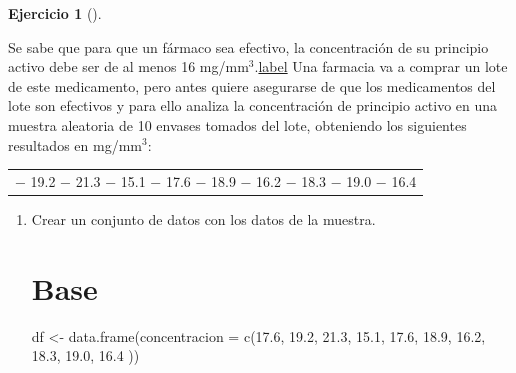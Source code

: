 \documentclass[
  a4paper,
]{scrreport}
\newenvironment{Shaded}{\begin{snugshade}}{\end{snugshade}}
\newcommand{\AttributeTok}[1]{\textcolor[rgb]{0.40,0.45,0.13}{#1}}
\newcommand{\FloatTok}[1]{\textcolor[rgb]{0.68,0.00,0.00}{#1}}
\newcommand{\FunctionTok}[1]{\textcolor[rgb]{0.28,0.35,0.67}{#1}}
\newcommand{\NormalTok}[1]{\textcolor[rgb]{0.00,0.23,0.31}{#1}}
\newcommand{\OtherTok}[1]{\textcolor[rgb]{0.00,0.23,0.31}{#1}}
\theoremstyle{definition}
\newtheorem{exercise}{Ejercicio}[chapter]
\theoremstyle{remark}
\begin{document}
\begin{exercise}[]\protect\hypertarget{exr-intervalo-media-principio-activo}{}\label{exr-intervalo-media-principio-activo}

Se sabe que para que un fármaco sea efectivo, la concentración de su
principio activo debe ser de al menos 16
mg/mm\(^3\).\href{http://localhost:1313/09-contrastes-hipotesis-parametricos.html}{label}
Una farmacia va a comprar un lote de este medicamento, pero antes quiere
asegurarse de que los medicamentos del lote son efectivos y para ello
analiza la concentración de principio activo en una muestra aleatoria de
10 envases tomados del lote, obteniendo los siguientes resultados en
mg/mm\(^{3}\):

\begin{longtable}[]{@{}c@{}}
\toprule\noalign{}
\endhead
\bottomrule\noalign{}
\endlastfoot
17.6 − 19.2 − 21.3 − 15.1 − 17.6 − 18.9 − 16.2 − 18.3 − 19.0 − 16.4 \\
\end{longtable}

\begin{enumerate}
\def\labelenumi{\alph{enumi}.}
\item
  Crear un conjunto de datos con los datos de la muestra.

  \begin{tcolorbox}[enhanced jigsaw, colframe=quarto-callout-tip-color-frame, toprule=.15mm, bottomtitle=1mm, breakable, opacitybacktitle=0.6, toptitle=1mm, colback=white, bottomrule=.15mm, title=\textcolor{quarto-callout-tip-color}{\faLightbulb}\hspace{0.5em}{Solución}, arc=.35mm, left=2mm, titlerule=0mm, rightrule=.15mm, coltitle=black, leftrule=.75mm, opacityback=0, colbacktitle=quarto-callout-tip-color!10!white]

  \section{Base}

\begin{Shaded}
\begin{Highlighting}[]
\NormalTok{df }\OtherTok{\textless{}{-}} \FunctionTok{data.frame}\NormalTok{(}\AttributeTok{concentracion =} \FunctionTok{c}\NormalTok{(}\FloatTok{17.6}\NormalTok{, }\FloatTok{19.2}\NormalTok{, }\FloatTok{21.3}\NormalTok{, }\FloatTok{15.1}\NormalTok{, }\FloatTok{17.6}\NormalTok{, }\FloatTok{18.9}\NormalTok{, }\FloatTok{16.2}\NormalTok{, }\FloatTok{18.3}\NormalTok{, }\FloatTok{19.0}\NormalTok{, }\FloatTok{16.4}\NormalTok{ ))}
\end{Highlighting}
\end{Shaded}


\end{tcolorbox}
\end{enumerate}
\end{exercise}
\end{document}
